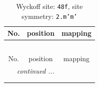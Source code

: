 \documentclass[fleqn,8pt]{jsarticle}
\begin{document}
\renewcommand{\arraystretch}{1.2}
\begin{longtable}{ccc}
\caption{Wyckoff site: {\tt 48f}, site symmetry: {\tt 2.m'm'}}
 \\
 \hline \hline
No. & position & mapping \\ \hline \endfirsthead

\multicolumn{2}{l}{\tablename\ \thetable{}} \\
 \hline \hline
No. & position & mapping \\ \hline \endhead

 \hline \hline
\multicolumn{2}{r}{\footnotesize\it continued ...} \\ \endfoot

 \hline \hline
\multicolumn{2}{r}{} \\ \endlastfoot


\end{longtable}
\end{document}
